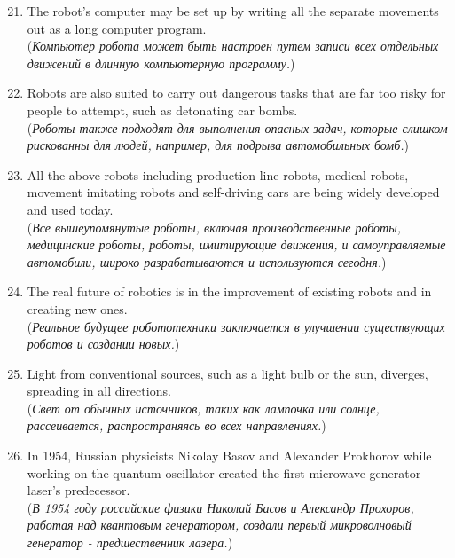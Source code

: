 \begin{enumerate}
      \setcounter{enumi}{20}
      \item The robot’s computer may be set up by writing all the separate movements out as a long computer program.\\
            (\textit{Компьютер робота может быть настроен путем записи всех отдельных движений в длинную компьютерную программу.})

      \item Robots are also suited to carry out dangerous tasks that are far too risky for people to attempt, such as detonating car bombs.\\
            (\textit{Роботы также подходят для выполнения опасных задач, которые слишком рискованны для людей, например, для подрыва автомобильных бомб.})

      \item All the above robots including production-line robots, medical robots, movement imitating robots and self-driving cars are being widely developed and used today.\\
            (\textit{Все вышеупомянутые роботы, включая производственные роботы, медицинские роботы, роботы, имитирующие движения, и самоуправляемые автомобили, широко разрабатываются и используются сегодня.})

      \item The real future of robotics is in the improvement of existing robots and in creating new ones.\\
            (\textit{Реальное будущее робототехники заключается в улучшении существующих роботов и создании новых.})

      \item Light from conventional sources, such as a light bulb or the sun, diverges, spreading in all directions.\\
            (\textit{Свет от обычных источников, таких как лампочка или солнце, рассеивается, распространяясь во всех направлениях.})

      \item In 1954, Russian physicists Nikolay Basov and Alexander Prokhorov while working on the quantum oscillator created the first microwave generator - laser’s predecessor.\\
            (\textit{В 1954 году российские физики Николай Басов и Александр Прохоров, работая над квантовым генератором, создали первый микроволновый генератор - предшественник лазера.})


\end{enumerate}
